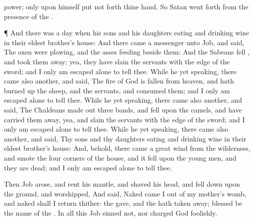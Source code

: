 {power; only upon himself put not
forth thine
hand. So
Satan went
forth from the
presence of the
{}.
\par }{\PP {}¶ And there was a
day when his
sons and his
daughters
{}
eating and
drinking
wine in their
eldest
brother’s
house:
And there
came a
messenger unto
Job, and
said, The
oxen were
plowing, and the
asses
feeding
beside them:
And the
Sabeans
fell
{}, and took them
away; yea, they have
slain the
servants with the
edge of the
sword; and I only am
escaped alone to
tell thee.
While he
{} yet
speaking, there
came also another, and
said, The
fire of
God is
fallen from
heaven, and hath burned
up the
sheep, and the
servants, and
consumed them; and I only am
escaped alone to
tell thee.
While he
{} yet
speaking, there
came also another, and
said, The
Chaldeans made
out
three
bands, and
fell upon the
camels, and have carried them
away, yea, and
slain the
servants with the
edge of the
sword; and I only am
escaped alone to
tell thee.
While he
{} yet
speaking, there
came also another, and
said, Thy
sons and thy
daughters
{}
eating and
drinking
wine in their
eldest
brother’s
house:
And, behold, there
came a
great
wind
from the
wilderness, and
smote the
four
corners of the
house, and it
fell upon the young
men, and they are
dead; and I only am
escaped alone to
tell thee.
\par }{\PP {}Then
Job
arose, and
rent his
mantle, and
shaved his
head, and fell
down upon the
ground, and
worshipped,
And
said,
Naked came I
out of my
mother’s
womb, and
naked shall I
return thither: the
{}
gave, and the
{} hath taken
away;
blessed be the
name of the
{}.
In all this
Job
sinned not, nor
charged
God
foolishly.

}
